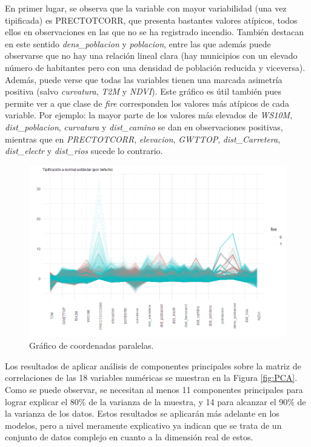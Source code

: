 \documentclass[12pt,a4paper,]{book}
\numberwithin{dummy}{section}
\theoremstyle{ocrenumbox}
\theoremstyle{blacknumex}
\theoremstyle{blacknumbox}
\theoremstyle{ocrenum}
\theoremstyle{ocrenum}
\begin{document}
En primer lugar, se observa que la variable con mayor variabilidad (una
vez tipificada) es PRECTOTCORR, que presenta bastantes valores atípicos,
todos ellos en observaciones en las que no se ha registrado incendio.
También destacan en este sentido \emph{dens\_poblacion} y
\emph{poblacion}, entre las que además puede observarse que no hay una
relación lineal clara (hay municipios con un elevado número de
habitantes pero con una densidad de población reducida y viceversa).
Además, puede verse que todas las variables tienen una marcada asimetría
positiva (salvo \emph{curvatura}, \emph{T2M} y \emph{NDVI}). Este
gráfico es útil también pues permite ver a que clase de \emph{fire}
corresponden los valores más atípicos de cada variable. Por ejemplo: la
mayor parte de los valores más elevados de \emph{WS10M},
\emph{dist\_poblacion}, \emph{curvatura} y \emph{dist\_camino} se dan en
observaciones positivas, mientras que en \emph{PRECTOTCORR},
\emph{elevacion}, \emph{GWTTOP}, \emph{dist\_Carretera},
\emph{dist\_electr} y \emph{dist\_rios} sucede lo contrario.

\begin{figure}[h]
\centering
\includegraphics[width =\textwidth]{graficos/parcoord.png}
\caption{Gráfico de coordenadas paralelas.}
\label{fig:parcoord}
\end{figure}

Los resultados de aplicar análisis de componentes principales sobre la
matriz de correlaciones de las 18 variables numéricas se muestran en la
Figura \ref{fig:PCA}. Como se puede observar, se necesitan al menos 11
componentes principales para lograr explicar el 80\% de la varianza de
la muestra, y 14 para alcanzar el 90\% de la varianza de los datos.
Estos resultados se aplicarán más adelante en los modelos, pero a nivel
meramente explicativo ya indican que se trata de un conjunto de datos
complejo en cuanto a la dimensión real de estos.
\end{document}
